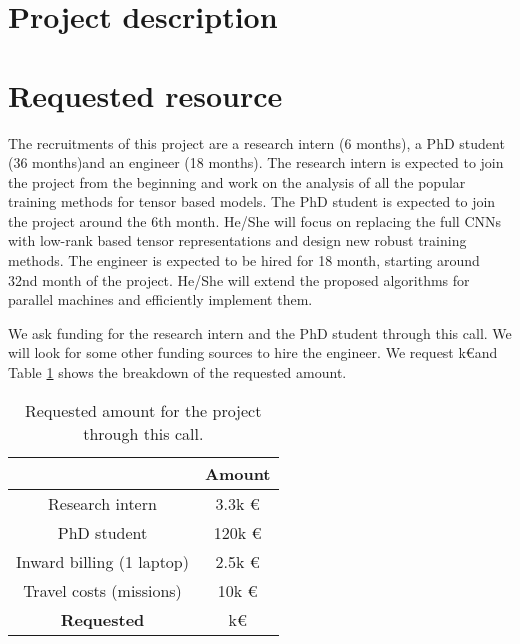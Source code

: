 \documentclass[11pt]{article}
\begin{document}
\section{Project description}


\section{Requested resource}
The recruitments of this project are a research intern (6 months), a PhD student  (36 months)and an engineer (18 months). The  research intern is expected to join the project from the beginning and work on the analysis of all the popular training methods for tensor based models. The PhD student is expected to join the project around the 6th month. He/She will focus on replacing the full CNNs  with low-rank based tensor representations and design new robust training methods. The engineer is expected to be hired for 18 month, starting around 32nd month of the project. He/She will extend the proposed algorithms for parallel machines and efficiently implement them. 


We ask funding for the research intern and the PhD student through this call. We will look for some other funding sources to hire the engineer.  We request k\euro and Table \ref{tab:reqcost} shows the breakdown of the requested amount.

\begin{table}
	\begin{center}
\begin{tabular}{|c|c|}
\hline
& Amount\\ \hline
Research intern & 3.3k \euro \\ \hline
PhD student & 120k \euro \\ \hline
Inward billing (1 laptop) & 2.5k \euro \\ \hline
Travel costs (missions) & 10k \euro \\ \hline
\textbf{Requested} & k\euro\\ \hline
\end{tabular}
	\caption{Requested amount for the project through this call.\label{tab:reqcost}}
\end{center}
\end{table}
\end{document}
